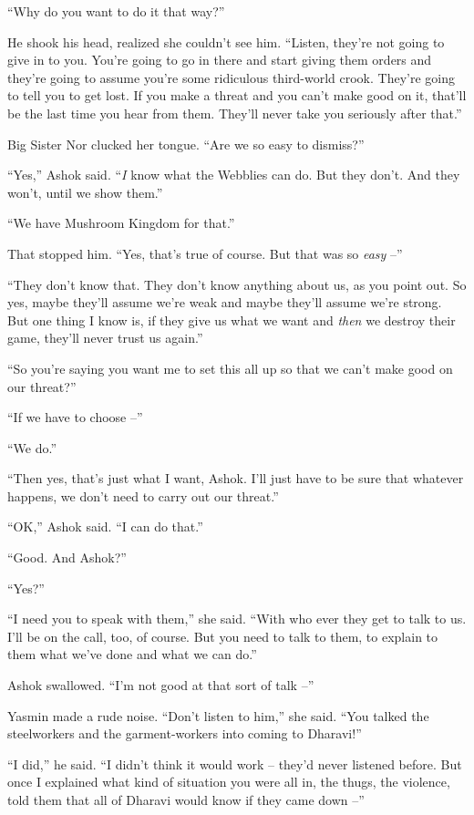 ``Why do you want to do it that way?''

He shook his head, realized she couldn't see him. ``Listen, they're
not going to give in to you. You're going to go in there and start
giving them orders and they're going to assume you're some
ridiculous third-world crook. They're going to tell you to get
lost. If you make a threat and you can't make good on it, that'll
be the last time you hear from them. They'll never take you
seriously after that.''

Big Sister Nor clucked her tongue. ``Are we so easy to dismiss?''

``Yes,'' Ashok said. ``\emph{I} know what the Webblies can do. But
they don't. And they won't, until we show them.''

``We have Mushroom Kingdom for that.''

That stopped him. ``Yes, that's true of course. But that was so
\emph{easy} --''

``They don't know that. They don't know anything about us, as you
point out. So yes, maybe they'll assume we're weak and maybe
they'll assume we're strong. But one thing I know is, if they give
us what we want and \emph{then} we destroy their game, they'll
never trust us again.''

``So you're saying you want me to set this all up so that we can't
make good on our threat?''

``If we have to choose --''

``We do.''

``Then yes, that's just what I want, Ashok. I'll just have to be
sure that whatever happens, we don't need to carry out our
threat.''

``OK,'' Ashok said. ``I can do that.''

``Good. And Ashok?''

``Yes?''

``I need you to speak with them,'' she said. ``With who ever they get
to talk to us. I'll be on the call, too, of course. But you need to
talk to them, to explain to them what we've done and what we can
do.''

Ashok swallowed. ``I'm not good at that sort of talk --''

Yasmin made a rude noise. ``Don't listen to him,'' she said. ``You
talked the steelworkers and the garment-workers into coming to
Dharavi!''

``I did,'' he said. ``I didn't think it would work -- they'd never
listened before. But once I explained what kind of situation you
were all in, the thugs, the violence, told them that all of Dharavi
would know if they came down --''

